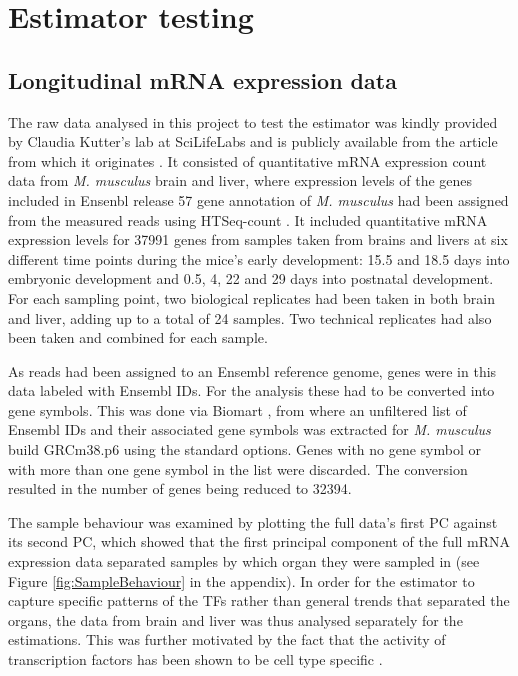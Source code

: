 \section{Estimator testing}

\subsection{Longitudinal mRNA expression data}

The raw data analysed in this project to test the estimator was kindly provided by Claudia Kutter's lab at SciLifeLabs and is publicly available from the article from which it originates \cite{Schmitt2014}. It consisted of quantitative mRNA expression count data from \textit{M. musculus} brain and liver, where expression levels of the genes included in Ensenbl release 57 gene annotation of \textit{M. musculus} \cite{Flicek2014} had been assigned from the measured reads using HTSeq-count \cite{Anders2014}. It included quantitative mRNA expression levels for 37991 genes from samples taken from brains and livers at six different time points during the mice's early development: 15.5 and 18.5 days into embryonic development and 0.5, 4, 22 and 29 days  into postnatal development. For each sampling point, two biological replicates had been taken in both brain and liver, adding up to a total of 24 samples. Two technical replicates had also been taken and combined for each sample. 

As reads had been assigned to an Ensembl reference genome, genes were in this data labeled with Ensembl IDs. For the analysis these had to be converted into gene symbols. This was done via Biomart \cite{Smedley2015}, from where an unfiltered list of Ensembl IDs and their associated gene symbols was extracted for \textit{M. musculus} build GRCm38.p6 using the standard options. Genes with no gene symbol or with more than one gene symbol in the list were discarded. The conversion resulted in the number of genes being reduced to 32394.

The sample behaviour was examined by plotting the full data's first \ac{PC} against its second \ac{PC}, which showed that the first principal component of the full mRNA expression data separated samples by which organ they were sampled in (see Figure \ref{fig:SampleBehaviour} in the appendix). In order for the estimator to capture specific patterns of the \acp{TF} rather than general trends that separated the organs, the data from brain and liver was thus analysed separately for the estimations. This was further motivated by the fact that the activity of transcription factors has been shown to be cell type specific \cite{Gurdon2016}.

